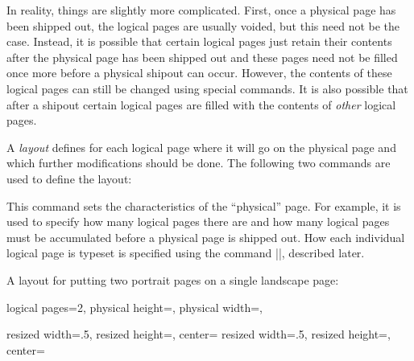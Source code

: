 In reality, things are slightly more complicated. First, once a physical page
has been shipped out, the logical pages are usually voided, but this need not
be the case. Instead, it is possible that certain logical pages just retain
their contents after the physical page has been shipped out and these pages
need not be filled once more before a physical shipout can occur. However, the
contents of these logical pages can still be changed using special commands. It
is also possible that after a shipout certain logical pages are filled with the
contents of \emph{other} logical pages.

A \emph{layout} defines for each logical page where it will go on the physical
page and which further modifications should be done. The following two commands
are used to define the layout:

\begin{command}{\pgfpagesphysicalpageoptions{}}
    This command sets the characteristics of the ``physical'' page. For
    example, it is used to specify how many logical pages there are and how
    many logical pages must be accumulated before a physical page is shipped
    out. How each individual logical page is typeset is specified using the
    command |\pgfpageslogicalpageoptions|, described later.

    \example A layout for putting two portrait pages on a single landscape
    page:
\begin{codeexample}
\pgfpagesphysicalpageoptions
{%
  logical pages=2,%
  physical height=\paperwidth,%
  physical width=\paperheight,%
}

{%
  resized width=.5\pgfphysicalwidth,%
  resized height=\pgfphysicalheight,%
  center=\pgfpoint{.25\pgfphysicalwidth}{.5\pgfphysicalheight}%
}%
{%
  resized width=.5\pgfphysicalwidth,%
  resized height=\pgfphysicalheight,%
  center=\pgfpoint{.75\pgfphysicalwidth}{.5\pgfphysicalheight}%
}%
\end{codeexample}


\end{command}
